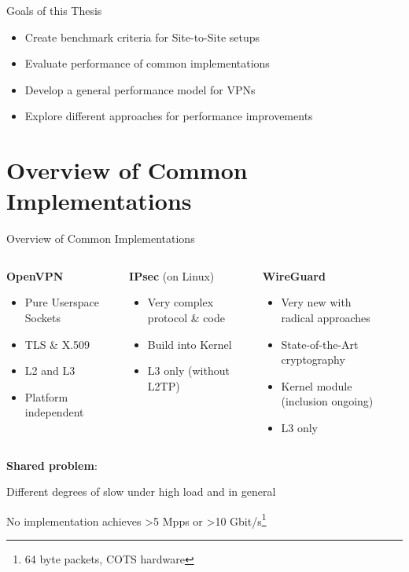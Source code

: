 \documentclass[NET,english]{tumbeamer}
\begin{document}
\begin{frame}{Goals of this Thesis}
	\begin{itemize}
		\item Create benchmark criteria for Site-to-Site setups
		\item Evaluate performance of common implementations
		\item Develop a general performance model for VPNs
		\item Explore different approaches for performance improvements
	\end{itemize}
\end{frame}

\section{Overview of Common Implementations}
\begin{frame}{Overview of Common Implementations}
	\begin{columns}[T] %
		\begin{column}{.30\textwidth}
			\textbf{OpenVPN}
			\begin{itemize}
				\item Pure Userspace\\
					Sockets
				\item TLS \& X.509
				\item L2 and L3
				\item Platform independent
			\end{itemize}
		\end{column}%
		\hfill%
		\begin{column}{.32\textwidth}
			\textbf{IPsec} (on Linux)
			\begin{itemize}
				\item Very complex\\
				protocol \& code
				\item Build into Kernel
				\item L3 only (without L2TP)
			\end{itemize}
		\end{column}%
		\hfill%
		\begin{column}{.35\textwidth}
			\textbf{WireGuard}
			\begin{itemize}
				\item Very new with\\ radical approaches
				\item State-of-the-Art cryptography
				\item Kernel module\\(inclusion ongoing)
				\item L3 only
			\end{itemize}
		\end{column}%
	\end{columns}

	\pause
	\vspace*{0.5em}
	\textbf{Shared problem}:
	
	Different degrees of slow under high load and in general
	
	No implementation achieves >5 Mpps or >10 Gbit/s\footnote{64 byte packets, COTS hardware}
\end{frame}
\end{document}
